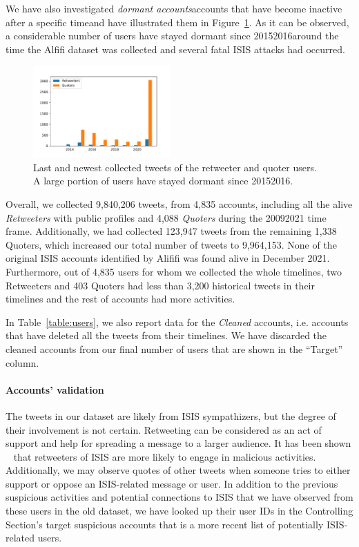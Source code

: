\documentclass[letterpaper]{article} %
\begin{document}
We have also investigated \textit{dormant accounts}accounts that have become inactive after a specific timeand have illustrated them in Figure~\ref{fig:last-activity}. As it can be observed, a considerable  number  of  users  have stayed dormant since 20152016around the time the Alfifi dataset was collected and several fatal ISIS attacks had occurred.

\begin{figure}[htbp]
\includegraphics[width=0.47\textwidth]{img/newest-activity.pdf}
\caption{Last and newest collected tweets of the retweeter and quoter users. A large portion of users have stayed dormant since 20152016.}
\label{fig:last-activity}
\end{figure}


Overall, we collected 9,840,206 tweets, from 4,835 accounts, including all the alive \textit{Retweeters} with public profiles and 4,088 \textit{Quoters} during the 20092021 time frame. Additionally, we had collected 123,947 tweets from the remaining 1,338 Quoters, which increased our total number of tweets to 9,964,153. None of the original ISIS accounts identified by Alififi \cite{alfifi2018measuring} was found alive in December 2021. Furthermore, out of 4,835 users for whom we collected the whole timelines, two Retweeters and 403 Quoters had less than 3,200 historical tweets in their timelines and the rest of accounts had more activities.

In Table~\ref{table:users}, we also report data for the {\em Cleaned}  accounts, i.e. accounts  that  have deleted all the tweets from their timelines.  We have discarded the cleaned accounts from our final number of users that are shown in the ``Target'' column.

\paragraph{Accounts' validation}

The tweets in our dataset are likely from ISIS sympathizers, but the degree of their involvement is not certain.
Retweeting can be considered as an act of support and help for spreading a message to a larger audience. It has been shown ~\cite{alfifi2018measuring} that retweeters of ISIS are more likely to engage in malicious activities. Additionally, we may observe quotes of other tweets when someone tries to either support or oppose an ISIS-related message or user. In addition to the previous suspicious activities and potential connections to ISIS that we have observed from these users in the old dataset, we have looked up their user IDs in the Controlling Section's target suspicious accounts that is a more recent list of potentially ISIS-related users.
\end{document}
